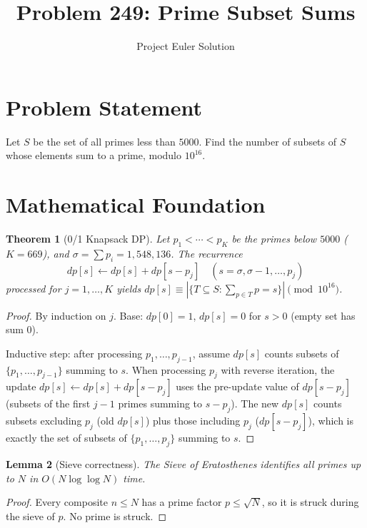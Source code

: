 \documentclass[12pt]{article}
\title{Problem 249: Prime Subset Sums}
\author{Project Euler Solution}
\date{}
\newtheorem{theorem}{Theorem}
\newtheorem{lemma}[theorem]{Lemma}
\begin{document}
\maketitle

\section{Problem Statement}

Let $S$ be the set of all primes less than $5000$. Find the number of subsets of $S$ whose elements sum to a prime, modulo $10^{16}$.

\section{Mathematical Foundation}

\begin{theorem}[0/1 Knapsack DP]\label{thm:dp}
Let $p_1<\cdots<p_K$ be the primes below $5000$ ($K=669$), and $\sigma=\sum p_i=1{,}548{,}136$. The recurrence
\[
dp[s]\leftarrow dp[s]+dp[s-p_j] \quad (s=\sigma,\sigma-1,\ldots,p_j)
\]
processed for $j=1,\ldots,K$ yields $dp[s]\equiv|\{T\subseteq S:\sum_{p\in T}p=s\}|\pmod{10^{16}}$.
\end{theorem}

\begin{proof}
By induction on $j$. Base: $dp[0]=1$, $dp[s]=0$ for $s>0$ (empty set has sum 0).

Inductive step: after processing $p_1,\ldots,p_{j-1}$, assume $dp[s]$ counts subsets of $\{p_1,\ldots,p_{j-1}\}$ summing to $s$. When processing $p_j$ with reverse iteration, the update $dp[s]\leftarrow dp[s]+dp[s-p_j]$ uses the pre-update value of $dp[s-p_j]$ (subsets of the first $j-1$ primes summing to $s-p_j$). The new $dp[s]$ counts subsets excluding $p_j$ (old $dp[s]$) plus those including $p_j$ ($dp[s-p_j]$), which is exactly the set of subsets of $\{p_1,\ldots,p_j\}$ summing to $s$.
\end{proof}

\begin{lemma}[Sieve correctness]\label{lem:sieve}
The Sieve of Eratosthenes identifies all primes up to $N$ in $O(N\log\log N)$ time.
\end{lemma}

\begin{proof}
Every composite $n\le N$ has a prime factor $p\le\sqrt{N}$, so it is struck during the sieve of $p$. No prime is struck.
\end{proof}
\end{document}
